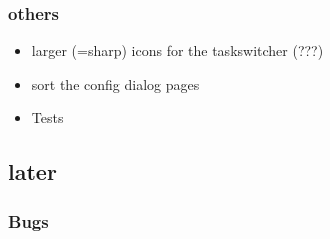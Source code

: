 \documentclass[10pt,a4paper,landscape]{report}
\begin{document}
\subsubsection{others}
\begin{itemize}
\item larger (=sharp) icons for the taskswitcher (???)
\item sort the config dialog pages
\item Tests
\end{itemize}


\subsection{later}

\subsubsection{Bugs}
\end{document}
